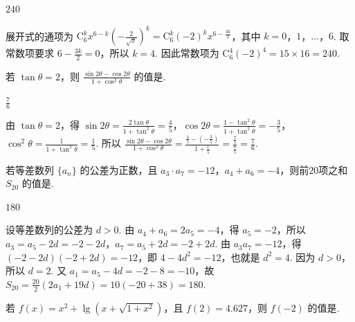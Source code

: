 \begin{answer}
\(240\)
\end{answer}

\begin{solution}
展开式的通项为 \(\mathrm C_6^k x^{6-k}\left(-\frac{2}{\sqrt{x}}\right)^k=\mathrm C_6^k(-2)^k x^{6-\frac{3k}{2}}\)，其中 \(k=0\)，\(1\)，\(\ldots\)，\(6\). 取常数项要求 \(6-\frac{3k}{2}=0\)，所以 \(k=4\). 因此常数项为 \(\mathrm C_6^4(-2)^4=15\times16=240\).
\end{solution}


\begin{problem}

若 \(\tan \theta = 2\)，则 \(\frac{\sin 2\theta - \cos 2\theta}{1 + \cos^2 \theta}\) 的值是\fillinblank{}.
\end{problem}

\begin{answer}
\(\frac{7}{6}\)
\end{answer}

\begin{solution}
由 \(\tan\theta=2\)，得 \(\sin2\theta=\frac{2\tan\theta}{1+\tan^2\theta}=\frac45\)，\(\cos2\theta=\frac{1-\tan^2\theta}{1+\tan^2\theta}=-\frac35\)，\(\cos^2\theta=\frac{1}{1+\tan^2\theta}=\frac15\). 所以
\(
\frac{\sin2\theta-\cos2\theta}{1+\cos^2\theta}=\frac{\frac45-\left(-\frac35\right)}{1+\frac15}=\frac{\frac75}{\frac65}=\frac76
\).
\end{solution}


\begin{problem}

若等差数列 \(\{a_{n}\}\) 的公差为正数，且 \(a_{3} \cdot a_{7} = -12\)，\(a_{4} + a_{6} = -4\)，则前\(20\)项之和 \(S_{20}\) 的值是\fillinblank{}.
\end{problem}

\begin{answer}
\(180\)
\end{answer}

\begin{solution}
设等差数列的公差为 \(d>0\). 由 \(a_4+a_6=2a_5=-4\)，得 \(a_5=-2\)，所以 \(a_3=a_5-2d=-2-2d\)，\(a_7=a_5+2d=-2+2d\). 由 \(a_3a_7=-12\)，得 \((-2-2d)(-2+2d)=-12\)，即 \(4-4d^2=-12\)，也就是 \(d^2=4\). 因为 \(d>0\)，所以 \(d=2\). 又 \(a_1=a_5-4d=-2-8=-10\)，故 \(S_{20}=\frac{20}{2}(2a_1+19d)=10(-20+38)=180\).
\end{solution}


\begin{problem}

若 \(f(x)=x^{2}+\lg\left(x+\sqrt{1+x^{2}}\right)\)，且 \(f(2)=4.627\)，则 \(f(-2)\) 的值是\fillinblank{}.
\end{problem}


